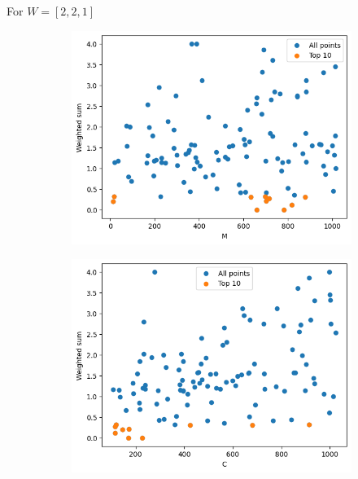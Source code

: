 \begin{frame}
    For \(W = [2, 2, 1]\)
    \begin{figure}
        \centering
        \hfill
        \begin{subfigure}{0.45\textwidth}
            \includegraphics[width=\textwidth]{../images/report/w221-M.png}
        \end{subfigure}
        \hfill
        \begin{subfigure}{0.45\textwidth}
            \includegraphics[width=\textwidth]{../images/report/w221-C.png}
        \end{subfigure}
        \hfill
        

\end{figure}
\end{frame}
